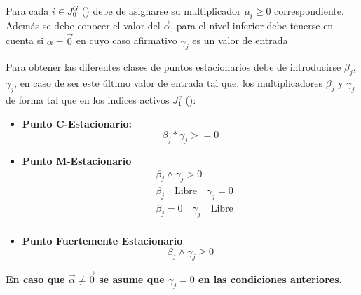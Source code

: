 Para cada $i \in J_0^G$ () debe de asignarse su multiplicador $\mu_i \geq 0$ correspondiente.
Además se debe conocer el valor del $\vec{\alpha}$,
para el nivel inferior debe tenerse en cuenta si $\alpha=\vec{0}$ en cuyo caso afirmativo $\gamma_j$ es un valor de entrada

\begin{samepage}
Para obtener las diferentes clases de puntos estacionarios debe de introducirse $\beta_j$, $\gamma_j$, en caso de ser este último valor de entrada tal que, los multiplicadores $\beta_j$  y $\gamma_j$ de forma tal que en los indices activos $J_1^v$ (): 
\begin{itemize}
    \item \textbf{Punto C-Estacionario:}\\
    \begin{equation}
        \beta_j * \gamma_j >=0
        \label{Requisitos puntos C-Estacionario}
    \end{equation}
    \item \textbf{Punto M-Estacionario}\\
    \begin{equation}
        \begin{aligned}
            &\beta_j \land \gamma_j>0\\
            &\beta_j \quad \text{Libre} \quad \gamma_j=0\\
            &\beta_j=0 \quad \gamma_j \quad \text{Libre}\\
        \end{aligned}
        \label{Requisitos puntos M-Estacionarios}
    \end{equation}
    \item \textbf{Punto Fuertemente Estacionario}\\
     \begin{equation}
        \beta_j \land \gamma_j \geq 0
    \label{Requisitos puntos Fuertemente Estacionarios}
    \end{equation}    
\end{itemize}
\textbf{En caso que $\vec{\alpha} \neq \vec{0}$ se asume que $\gamma_j=0$ en las condiciones anteriores.}
\end{samepage}

